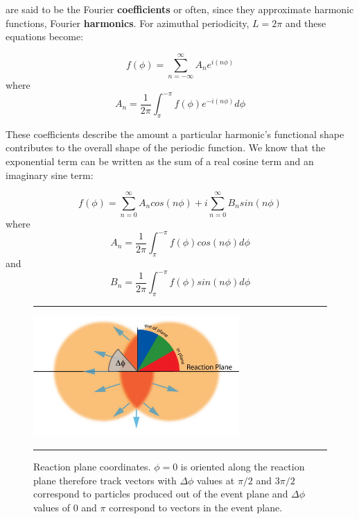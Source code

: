 are said to be the Fourier \textbf{coefficients} or often, since they approximate harmonic functions, Fourier \textbf{harmonics}. For azimuthal periodicity, $L=2\pi$ and these equations become: 

\begin{equation}
f(\phi) = \sum^{\infty}_{n=-\infty} A_{n} e^{i(n \phi)}
\end{equation}
where
\begin{equation}
A_{n} = \frac{1}{2\pi} \int^{-\pi}_{\pi} f(\phi) e^{-i(n \phi)} d\phi
\end{equation}

These coefficients describe the amount a particular harmonic's functional shape contributes to the overall shape of the periodic function. We know that the exponential term can be written as the sum of a real cosine term and an imaginary sine term:

\begin{equation}
f(\phi) = \sum^{\infty}_{n=0} A_{n} cos ( n \phi) + i \sum^{\infty}_{n=0} B_{n} sin (n \phi)
\end{equation}
where
\begin{equation}
A_{n} = \frac{1}{2\pi} \int^{-\pi}_{\pi} f(\phi) cos (n \phi) d\phi
\end{equation}
and
\begin{equation}
B_{n} = \frac{1}{2\pi} \int^{-\pi}_{\pi} f(\phi) sin (n \phi) d\phi 
\end{equation}

\begin{figure}[htbp!]
  \centering
  \rule{35em}{0.5pt}
    \includegraphics[width=0.7\textwidth]{Figures/RP_InOutPlane_3.jpg}
        
  \caption[Reaction plane coordinates.]{Reaction plane coordinates. $\phi = 0$ is oriented along the reaction plane therefore track vectors with $\Delta\phi$ values at $\pi/2$ and $3 \pi / 2$ correspond to particles produced out of the event plane and $\Delta\phi$ values of $0$ and $\pi$ correspond to vectors in the event plane.}
  \rule{35em}{0.5pt}
  \label{fig:dphiep}
\end{figure}


